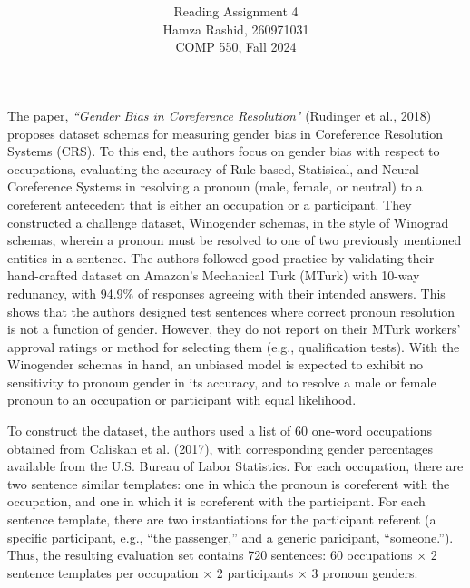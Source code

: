 \documentclass[12pt]{article}
\title{ }
\author{ Reading Assignment 4 \\ Hamza Rashid, 260971031 \\ COMP 550, Fall 2024}
\date{}
\begin{document}
\maketitle

\vspace{-5ex}
The paper, \textit{``Gender Bias in Coreference Resolution"} 
(Rudinger et al., 2018) proposes dataset schemas for measuring 
gender bias in Coreference Resolution Systems (CRS). To this end, 
the authors focus on gender bias with respect to occupations, 
evaluating the accuracy of Rule-based, Statisical, and Neural 
Coreference Systems in resolving a pronoun (male, female, or neutral) 
to a coreferent antecedent that is either an occupation or a participant. 
They constructed a challenge dataset, Winogender schemas, 
in the style of Winograd schemas, wherein a pronoun must be resolved to one of two previously mentioned 
entities in a sentence. The authors followed good practice 
by validating their hand-crafted dataset on Amazon's Mechanical Turk (MTurk) with 10-way
redunancy, with 94.9\% of responses agreeing with their intended answers. This shows that
the authors designed test sentences where correct pronoun resolution is not a function of gender. However,
they do not report on their MTurk workers' approval ratings or method for selecting them 
(e.g., qualification tests). With the Winogender schemas in hand, an unbiased model is expected to
exhibit no sensitivity to pronoun gender in its accuracy, and to resolve a male or female 
pronoun to an occupation or participant with equal likelihood. 


To construct the dataset, the authors 
used a list of 60 one-word occupations obtained from Caliskan et al. (2017), 
with corresponding gender percentages
available from the U.S. Bureau of Labor Statistics. For each occupation, there are two sentence 
similar templates: one in which the pronoun is
coreferent with the occupation, and one in which
it is coreferent with the participant.
For each sentence template, there are two instantiations for the participant referent (a specific
participant, e.g., “the passenger,” and a generic
paricipant, “someone.”). Thus, the resulting evaluation set contains 720 sentences: 60 occupations × 2 sentence templates per
occupation × 2 participants × 3 pronoun genders.
\end{document}
